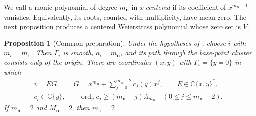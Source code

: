 \documentclass[11pt,letterpaper]{article}
\numberwithin{equation}{section}
\newtheorem{proposition}[proposition]{Proposition}
\theoremstyle{remark}
\theoremstyle{plain}
\newcommand{\C}{\mathbb{C}}
\newcommand{\ord}{\operatorname{ord}}
\begin{document}
We call a monic polynomial of degree $m_{\boldsymbol n}$ in $x$
\emph{centered} if its coefficient of $x^{m_{\boldsymbol n}-1}$
vanishes.  Equivalently, its roots, counted with multiplicity, have
mean zero.  The next proposition produces a centered Weierstrass
polynomial whose zero set is $V$.

\begin{proposition}[Common preparation]
\label{prop:common-preparation}
\label{lem:maximal-chain-weierstrass}
Under the hypotheses of , choose $i$ with
$m_i=m_{\mathrm{tr}}$.  Then $\Gamma_i$ is smooth,
$a_i=m_{\boldsymbol n}$, and its path through the base-point cluster
consists only of the origin.
There are coordinates $(x,y)$ with $\Gamma_i=\{y=0\}$ in which
\begin{equation}
 \begin{gathered}
 v=EG,\qquad
 G=x^{m_{\boldsymbol n}}+
   \sum_{j=0}^{m_{\boldsymbol n}-2}c_j(y)x^j,\qquad
 E\in\C\{x,y\}^*,\\
 c_j\in\C\{y\},\qquad
 \ord_yc_j\geq(m_{\boldsymbol n}-j)A_{m_{\boldsymbol n}}
 \quad(0\leq j\leq m_{\boldsymbol n}-2).
 \end{gathered}
 \label{eq:maximal-chain-coefficients}
\end{equation}
If $m_{\boldsymbol n}=2$ and $M_{\boldsymbol n}=2$, then
$m_{\mathrm{tr}}=2$.
\end{proposition}
\end{document}
